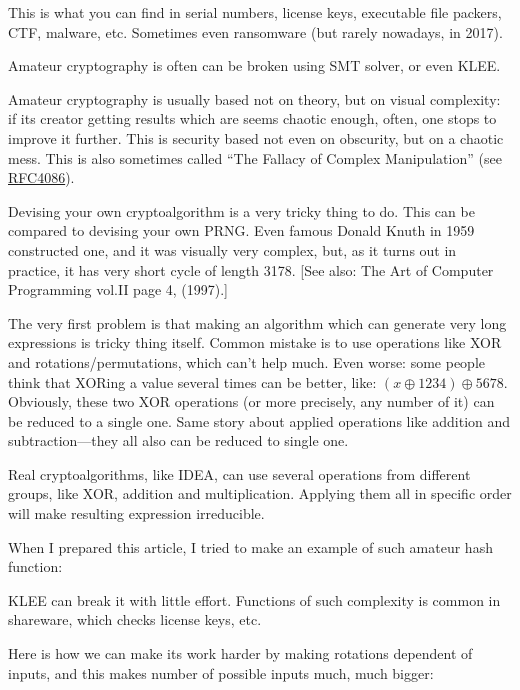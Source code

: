 This is what you can find in serial numbers, license keys, executable file packers, \ac{CTF}, malware, etc.
Sometimes even ransomware (but rarely nowadays, in 2017).

Amateur cryptography is often can be broken using SMT solver, or even KLEE.

Amateur cryptography is usually based not on theory, but on visual complexity:
if its creator getting results which are seems chaotic enough, often, one stops to improve it further.
This is security based not even on obscurity, but on a chaotic mess.
This is also sometimes called ``The Fallacy of Complex Manipulation''
(see \href{https://tools.ietf.org/html/rfc4086}{RFC4086}).

Devising your own cryptoalgorithm is a very tricky thing to do.
This can be compared to devising your own \ac{PRNG}.
Even famous Donald Knuth in 1959 constructed one, and it was visually very complex,
but, as it turns out in practice, it has very short cycle of length 3178.
[See also: The Art of Computer Programming vol.II page 4, (1997).]

The very first problem is that making an algorithm which can generate very long expressions is tricky thing itself.
Common mistake is to use operations like XOR and rotations/permutations, which can't help much.
Even worse: some people think that XORing a value several times can be better, like: $(x \oplus 1234) \oplus 5678$.
Obviously, these two XOR operations (or more precisely, any number of it) can be reduced to a single one.
Same story about applied operations like addition and subtraction---they all also can be reduced to single one.

Real cryptoalgorithms, like IDEA, can use several operations from different groups, like XOR, addition and multiplication.
Applying them all in specific order will make resulting expression irreducible.

When I prepared this article, I tried to make an example of such amateur hash function:



KLEE can break it with little effort.
Functions of such complexity is common in shareware, which checks license keys, etc.

Here is how we can make its work harder by making rotations dependent of inputs,
and this makes number of possible inputs much, much bigger:



